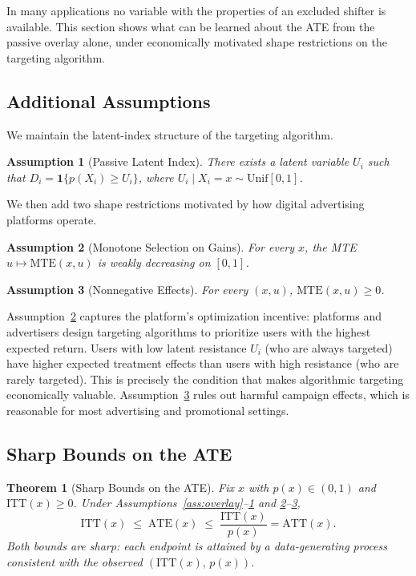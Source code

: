 \documentclass[12pt]{article}
\newtheorem{assumption}{Assumption}
\newtheorem{theorem}{Theorem}
\newcommand{\ATT}{\mathrm{ATT}}
\newcommand{\ATE}{\mathrm{ATE}}
\newcommand{\ITT}{\mathrm{ITT}}
\newcommand{\MTE}{\mathrm{MTE}}
\begin{document}
In many applications no variable with the properties of an excluded shifter
is available. This section shows what can be learned about the ATE from the
passive overlay alone, under economically motivated shape restrictions on the
targeting algorithm.

\subsection*{Additional Assumptions}

We maintain the latent-index structure of the targeting algorithm.

\begin{assumption}[Passive Latent Index]
\label{ass:passive}
There exists a latent variable $U_i$ such that $D_i = \mathbf{1}\{p(X_i)
\geq U_i\}$, where $U_i \mid X_i = x \sim \mathrm{Unif}[0,1]$.
\end{assumption}

We then add two shape restrictions motivated by how digital advertising
platforms operate.

\begin{assumption}[Monotone Selection on Gains]
\label{ass:monotone}
For every $x$, the MTE $u \mapsto \MTE(x, u)$ is weakly decreasing on
$[0,1]$.
\end{assumption}

\begin{assumption}[Nonnegative Effects]
\label{ass:nonnegative}
For every $(x, u)$, $\MTE(x, u) \geq 0$.
\end{assumption}

Assumption~\ref{ass:monotone} captures the platform's optimization incentive:
platforms and advertisers design targeting algorithms to prioritize users with
the highest expected return. Users with low latent resistance $U_i$ (who are
always targeted) have higher expected treatment effects than users with high
resistance (who are rarely targeted). This is precisely the condition that
makes algorithmic targeting economically valuable. Assumption~\ref{ass:nonnegative}
rules out harmful campaign effects, which is reasonable for most advertising
and promotional settings.

\subsection*{Sharp Bounds on the ATE}

\begin{theorem}[Sharp Bounds on the ATE]
\label{thm:sharp}
Fix $x$ with $p(x) \in (0,1)$ and $\ITT(x) \geq 0$. Under
Assumptions~\ref{ass:overlay}--\ref{ass:passive} and
\ref{ass:monotone}--\ref{ass:nonnegative},
\begin{equation}
  \ITT(x) \;\leq\; \ATE(x) \;\leq\; \frac{\ITT(x)}{p(x)} = \ATT(x).
  \label{eq:bounds}
\end{equation}
Both bounds are sharp: each endpoint is attained by a data-generating
process consistent with the observed $(\ITT(x),\, p(x))$.
\end{theorem}
\end{document}
